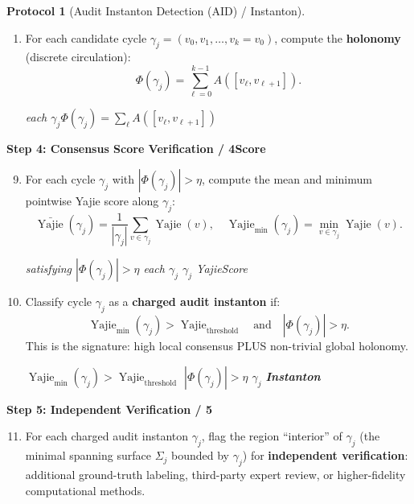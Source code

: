 \documentclass[11pt,a4paper]{article}
\theoremstyle{plain}
\theoremstyle{definition}
\newtheorem{protocol}[theorem]{Protocol}
\DeclareMathOperator{\Yajie}{Yajie}
\begin{document}
\begin{protocol}[Audit Instanton Detection (AID) / Instanton]
\begin{enumerate}[label=\arabic*.]
        \textit{define\textbf{1-} $A(e) = \bar{f}(v) - \bar{f}(u)$Hodge $(d_0 \bar{f})(e)$}

  \item For each candidate cycle $\gamma_j = (v_0, v_1, \ldots, v_k = v_0)$, 
        compute the \textbf{holonomy} (discrete circulation):
        \begin{equation}
          \Phi(\gamma_j) = \sum_{\ell=0}^{k-1} A([v_{\ell}, v_{\ell+1}]).
          \label{eq:holonomy_disc}
        \end{equation}
        
        \textit{each $\gamma_j$\textbf{}$\Phi(\gamma_j) = \sum_{\ell} A([v_{\ell}, v_{\ell+1}])$}
\end{enumerate}

\textbf{Step 4: Consensus Score Verification / 4Score}
\begin{enumerate}[label=\arabic*.]
  \setcounter{enumi}{8}
  \item For each cycle $\gamma_j$ with $|\Phi(\gamma_j)| > \eta$, compute 
        the mean and minimum pointwise Yajie score along $\gamma_j$:
        \begin{equation}
          \bar{\Yajie}(\gamma_j) = \frac{1}{|\gamma_j|} \sum_{v \in \gamma_j} 
            \Yajie(v), \quad 
          \Yajie_{\min}(\gamma_j) = \min_{v \in \gamma_j} \Yajie(v).
          \label{eq:yajie_cycle}
        \end{equation}
        
        \textit{satisfying $|\Phi(\gamma_j)| > \eta$ each $\gamma_j$ $\gamma_j$ YajieScore}
  
  \item Classify cycle $\gamma_j$ as a \textbf{charged audit instanton} if:
        \begin{equation}
          \Yajie_{\min}(\gamma_j) > \Yajie_{\text{threshold}} 
          \quad \text{and} \quad 
          |\Phi(\gamma_j)| > \eta.
          \label{eq:classification}
        \end{equation}
        This is the signature: high local consensus PLUS non-trivial 
        global holonomy.
        
        \textit{ $\Yajie_{\min}(\gamma_j) > \Yajie_{\text{threshold}}$  $|\Phi(\gamma_j)| > \eta$ $\gamma_j$ \textbf{Instanton}}
\end{enumerate}

\textbf{Step 5: Independent Verification / 5}
\begin{enumerate}[label=\arabic*.]
  \setcounter{enumi}{10}
  \item For each charged audit instanton $\gamma_j$, flag the region 
        ``interior'' of $\gamma_j$ (the minimal spanning surface 
        $\Sigma_j$ bounded by $\gamma_j$) for \textbf{independent 
        verification}: additional ground-truth labeling, third-party 
        expert review, or higher-fidelity computational methods.
        

\end{enumerate}
\end{protocol}
\end{document}
